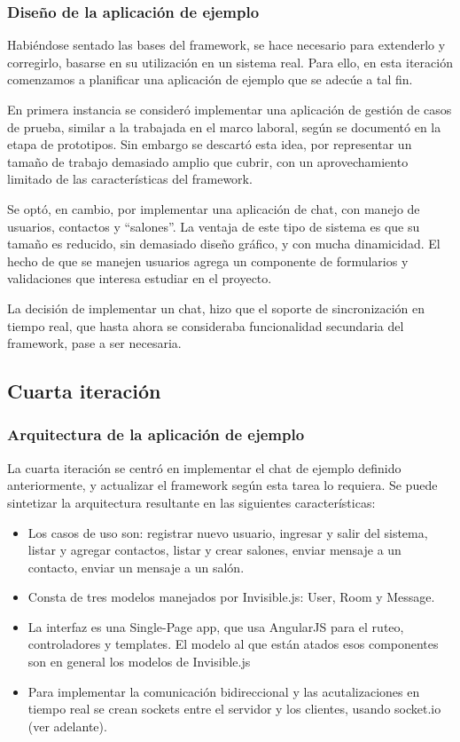 \documentclass[doc,helv,longtable]{article}
\begin{document}
\subsubsection{Diseño de la aplicación de ejemplo}
Habiéndose sentado las bases del framework, se hace necesario para extenderlo y corregirlo, basarse en su utilización en un sistema real. Para ello, en esta iteración comenzamos a planificar una aplicación de ejemplo que se adecúe a tal fin.

En primera instancia se consideró implementar una aplicación de gestión de casos de prueba, similar a la  trabajada en el marco laboral, según se documentó en la etapa de prototipos. Sin embargo se descartó esta idea, por representar un tamaño de trabajo demasiado amplio que cubrir, con un aprovechamiento limitado de las características del framework.

Se optó, en cambio, por implementar una aplicación de chat, con manejo de usuarios, contactos y “salones”. La ventaja de este tipo de sistema es que su tamaño es reducido, sin demasiado diseño gráfico, y con mucha dinamicidad. El hecho de que se manejen usuarios agrega un componente de formularios y validaciones que interesa estudiar en el proyecto.

La decisión de implementar un chat, hizo que el soporte de sincronización en tiempo real, que hasta ahora se consideraba funcionalidad secundaria del framework, pase a ser necesaria.

\subsection{Cuarta iteración}
\subsubsection{Arquitectura de la aplicación de ejemplo}
La cuarta iteración se centró en implementar el chat de ejemplo definido anteriormente, y actualizar el framework según esta tarea lo requiera. Se puede sintetizar la arquitectura resultante en las siguientes características:
\begin{itemize}
\item  Los casos de uso son: registrar nuevo usuario, ingresar y salir del sistema, listar y agregar contactos, listar y crear salones, enviar mensaje a un contacto, enviar un mensaje a un salón.
\item  Consta de tres modelos manejados por Invisible.js: User, Room y Message.
\item  La interfaz es una Single-Page app, que usa AngularJS para el ruteo, controladores y templates. El modelo al que están atados esos componentes son en general los modelos de Invisible.js
\item  Para implementar la comunicación bidireccional y las acutalizaciones en tiempo real se crean sockets entre el servidor y los clientes, usando socket.io (ver adelante).

\end{itemize}
\end{document}
